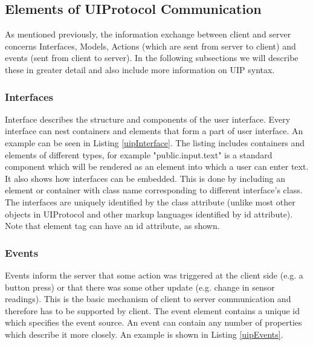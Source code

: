 \subsection{Elements of UIProtocol Communication}
As mentioned previously, the information exchange between client and server concerns Interfaces, Models, Actions (which are sent from server to client) and events (sent from client to server). In the following subsections we will describe these in greater detail and also include more information on UIP syntax.

\subsubsection{Interfaces}
Interface describes the structure and components of the user interface. Every interface can nest containers and elements that form a part of user interface. An example can be seen in Listing \ref{uipInterface}. The listing includes containers and elements of different types, for example "public.input.text" is a standard component which will be rendered as an element into which a user can enter text. It also shows how interfaces can be embedded. This is done by including an element or container with class name corresponding to different interface's class. The interfaces are uniquely identified by the class attribute (unlike most other objects in UIProtocol and other markup languages identified by id attribute). Note that element tag can have an id attribute, as shown.\\



\subsubsection{Events}
Events inform the server that some action was triggered at the client side (e.g. a button press) or that there was some other update (e.g. change in sensor readings). This is the basic mechanism of client to server communication and therefore has to be supported by client. The event element contains a unique id which specifies the event source. An event can contain any number of properties which describe it more closely. An example is shown in Listing \ref{uipEvents}.


